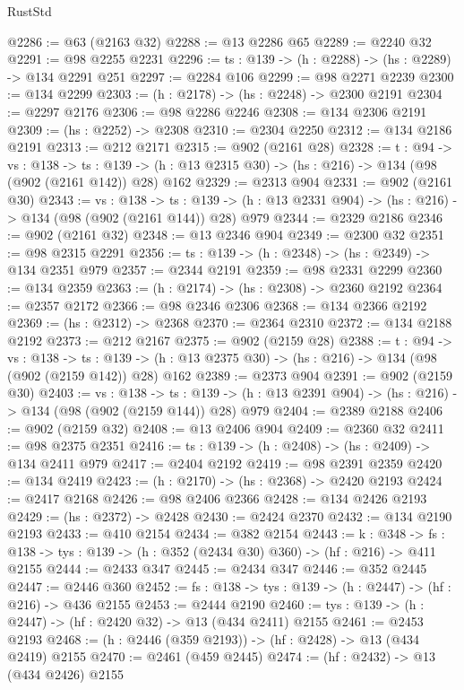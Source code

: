 \begin{lexlean}{RustStd}
\begin{coremodule}
{\begin{coremodule}
{{{{{{{{@2286 := @63 (@2163 @32)
@2288 := @13 @2286 @65
@2289 := @2240 @32
@2291 := @98 @2255 @2231
@2296 := {ts : @139} -> (h : @2288) -> (hs : @2289) -> @134 @2291 @251
@2297 := @2284 @106
@2299 := @98 @2271 @2239
@2300 := @134 @2299
@2303 := (h : @2178) -> (hs : @2248) -> @2300 @2191
@2304 := @2297 @2176
@2306 := @98 @2286 @2246
@2308 := @134 @2306 @2191
@2309 := (hs : @2252) -> @2308
@2310 := @2304 @2250
@2312 := @134 @2186 @2191
@2313 := @212 @2171
@2315 := @902 (@2161 @28)
@2328 := {t : @94} ->
  {vs : @138} ->
  {ts : @139} -> (h : @13 @2315 @30) -> (hs : @216) -> @134 (@98 (@902 (@2161 @142)) @28) @162
@2329 := @2313 @904
@2331 := @902 (@2161 @30)
@2343 := {vs : @138} ->
  {ts : @139} -> (h : @13 @2331 @904) -> (hs : @216) -> @134 (@98 (@902 (@2161 @144)) @28) @979
@2344 := @2329 @2186
@2346 := @902 (@2161 @32)
@2348 := @13 @2346 @904
@2349 := @2300 @32
@2351 := @98 @2315 @2291
@2356 := {ts : @139} -> (h : @2348) -> (hs : @2349) -> @134 @2351 @979
@2357 := @2344 @2191
@2359 := @98 @2331 @2299
@2360 := @134 @2359
@2363 := (h : @2174) -> (hs : @2308) -> @2360 @2192
@2364 := @2357 @2172
@2366 := @98 @2346 @2306
@2368 := @134 @2366 @2192
@2369 := (hs : @2312) -> @2368
@2370 := @2364 @2310
@2372 := @134 @2188 @2192
@2373 := @212 @2167
@2375 := @902 (@2159 @28)
@2388 := {t : @94} ->
  {vs : @138} ->
  {ts : @139} -> (h : @13 @2375 @30) -> (hs : @216) -> @134 (@98 (@902 (@2159 @142)) @28) @162
@2389 := @2373 @904
@2391 := @902 (@2159 @30)
@2403 := {vs : @138} ->
  {ts : @139} -> (h : @13 @2391 @904) -> (hs : @216) -> @134 (@98 (@902 (@2159 @144)) @28) @979
@2404 := @2389 @2188
@2406 := @902 (@2159 @32)
@2408 := @13 @2406 @904
@2409 := @2360 @32
@2411 := @98 @2375 @2351
@2416 := {ts : @139} -> (h : @2408) -> (hs : @2409) -> @134 @2411 @979
@2417 := @2404 @2192
@2419 := @98 @2391 @2359
@2420 := @134 @2419
@2423 := (h : @2170) -> (hs : @2368) -> @2420 @2193
@2424 := @2417 @2168
@2426 := @98 @2406 @2366
@2428 := @134 @2426 @2193
@2429 := (hs : @2372) -> @2428
@2430 := @2424 @2370
@2432 := @134 @2190 @2193
@2433 := @410 @2154
@2434 := @382 @2154
@2443 := {k : @348} ->
  {fs : @138} -> {tys : @139} -> (h : @352 (@2434 @30) @360) -> (hf : @216) -> @411 @2155
@2444 := @2433 @347
@2445 := @2434 @347
@2446 := @352 @2445
@2447 := @2446 @360
@2452 := {fs : @138} -> {tys : @139} -> (h : @2447) -> (hf : @216) -> @436 @2155
@2453 := @2444 @2190
@2460 := {tys : @139} -> (h : @2447) -> (hf : @2420 @32) -> @13 (@434 @2411) @2155
@2461 := @2453 @2193
@2468 := (h : @2446 (@359 @2193)) -> (hf : @2428) -> @13 (@434 @2419) @2155
@2470 := @2461 (@459 @2445)
@2474 := (hf : @2432) -> @13 (@434 @2426) @2155
}}}}}}}}
\end{coremodule}}
\end{coremodule}
\end{lexlean}
